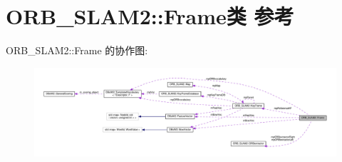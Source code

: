 \hypertarget{classORB__SLAM2_1_1Frame}{\section{O\-R\-B\-\_\-\-S\-L\-A\-M2\-:\-:Frame类 参考}
\label{classORB__SLAM2_1_1Frame}
}


O\-R\-B\-\_\-\-S\-L\-A\-M2\-:\-:Frame 的协作图\-:
\nopagebreak
\begin{figure}[H]
\begin{center}
\leavevmode
\includegraphics[width=350pt]{classORB__SLAM2_1_1Frame__coll__graph}
\end{center}
\end{figure}
